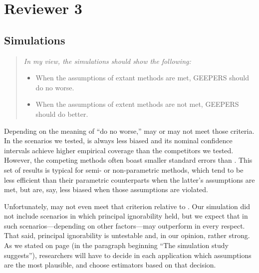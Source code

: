 \documentclass[]{article}
\newenvironment{itquote}
  {\begin{quote} \itshape}
  {\end{quote}\ignorespacesafterend}
\begin{document}
\section{Reviewer 3}


\subsection{Simulations}
\begin{itquote}
    In my view, the simulations should show the following:
\begin{itemize}
   \item When the assumptions of extant methods are met, GEEPERS should do no worse.
   \item When the assumptions of extent methods are not met, GEEPERS should do better.
\end{itemize}
\end{itquote}
Depending on the meaning of ``do no worse,'' \geepers may or may not meet those criteria. 
In the scenarios we tested, \geepers is always less biased and its nominal confidence intervals achieve higher empirical coverage than the competitors we tested.
However, the competing methods often boast smaller standard errors than \geepers. 
This set of results is typical for semi- or non-parametric methods, which tend to be less efficient than their parametric counterparts when the latter's assumptions are met, but are, say, less biased when those assumptions are violated.

Unfortunately, \geepers may not even meet that criterion relative to \psw. Our simulation did not include scenarios in which principal ignorability held, but we expect that in such scenarios---depending on other factors---\psw may outperform \geepers in every respect. 
That said, principal ignorability is untestable and, in our opinion, rather strong. 
As we stated on page \pageref{evalMetric} (in the paragraph beginning ``The simulation study suggests''), researchers will have to decide in each application which assumptions are the most plausible, and choose estimators based on that decision. 
\end{document}
